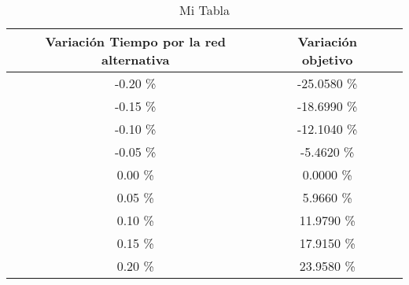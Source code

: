 \begin{table}
\centering
\begin{tabular}{|c|c|c|}
\hline
 Variación Tiempo por la red alternativa & Variación objetivo \\ \hline
-0.20 \% & -25.0580 \% \\ \hline
-0.15 \% & -18.6990 \% \\ \hline
-0.10 \% & -12.1040 \% \\ \hline
-0.05 \% & -5.4620 \% \\ \hline
0.00 \% & 0.0000 \% \\ \hline
0.05 \% & 5.9660 \% \\ \hline
0.10 \% & 11.9790 \% \\ \hline
0.15 \% & 17.9150 \% \\ \hline
0.20 \% & 23.9580 \% \\ \hline
\end{tabular}
\caption{Mi Tabla}
\end{table}
